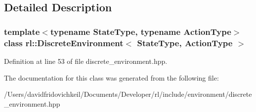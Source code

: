 \subsection{Detailed Description}
\subsubsection*{template$<$typename State\+Type, typename Action\+Type$>$\newline
class rl\+::\+Discrete\+Environment$<$ State\+Type, Action\+Type $>$}



Definition at line 53 of file discrete\+\_\+environment.\+hpp.



The documentation for this class was generated from the following file\+:\begin{DoxyCompactItemize}
\item 
/\+Users/davidfridovichkeil/\+Documents/\+Developer/rl/include/environment/discrete\+\_\+environment.\+hpp\end{DoxyCompactItemize}
